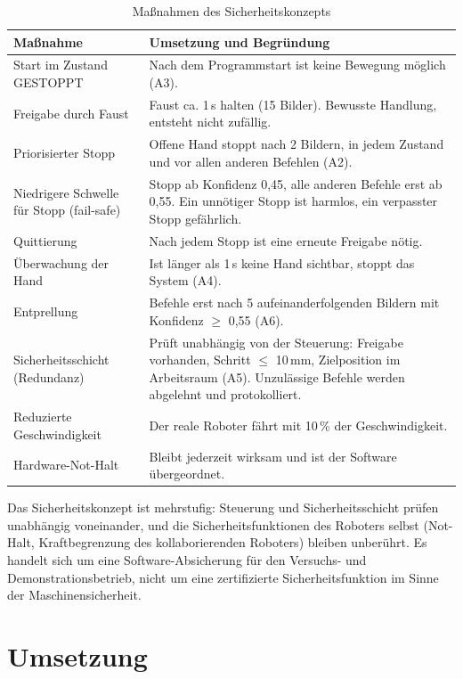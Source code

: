 \documentclass[11pt,a4paper]{article}
\begin{document}
\begin{table}[H]
\centering
\begin{tabularx}{\textwidth}{>{\raggedright\arraybackslash}p{4.3cm}>{\raggedright\arraybackslash}X}
\toprule
Maßnahme & Umsetzung und Begründung \\
\midrule
Start im Zustand GESTOPPT & Nach dem Programmstart ist keine Bewegung möglich (A3). \\
Freigabe durch Faust & Faust ca. 1\,s halten (15 Bilder). Bewusste Handlung, entsteht nicht zufällig. \\
Priorisierter Stopp & Offene Hand stoppt nach 2 Bildern, in jedem Zustand und vor allen anderen Befehlen (A2). \\
Niedrigere Schwelle für Stopp (fail-safe) & Stopp ab Konfidenz 0,45, alle anderen Befehle erst ab 0,55. Ein unnötiger Stopp ist harmlos, ein verpasster Stopp gefährlich. \\
Quittierung & Nach jedem Stopp ist eine erneute Freigabe nötig. \\
Überwachung der Hand & Ist länger als 1\,s keine Hand sichtbar, stoppt das System (A4). \\
Entprellung & Befehle erst nach 5 aufeinanderfolgenden Bildern mit Konfidenz $\geq$ 0,55 (A6). \\
Sicherheitsschicht (Redundanz) & Prüft unabhängig von der Steuerung: Freigabe vorhanden, Schritt $\leq$ 10\,mm, Zielposition im Arbeitsraum (A5). Unzulässige Befehle werden abgelehnt und protokolliert. \\
Reduzierte Geschwindigkeit & Der reale Roboter fährt mit 10\,\% der Geschwindigkeit. \\
Hardware-Not-Halt & Bleibt jederzeit wirksam und ist der Software übergeordnet. \\
\bottomrule
\end{tabularx}
\caption{Maßnahmen des Sicherheitskonzepts}
\end{table}

Das Sicherheitskonzept ist mehrstufig: Steuerung und Sicherheitsschicht prüfen unabhängig
voneinander, und die Sicherheitsfunktionen des Roboters selbst (Not-Halt, Kraftbegrenzung des
kollaborierenden Roboters) bleiben unberührt. Es handelt sich um eine Software-Absicherung für den
Versuchs- und Demonstrationsbetrieb, nicht um eine zertifizierte Sicherheitsfunktion im Sinne der
Maschinensicherheit.

\section{Umsetzung}
\end{document}
